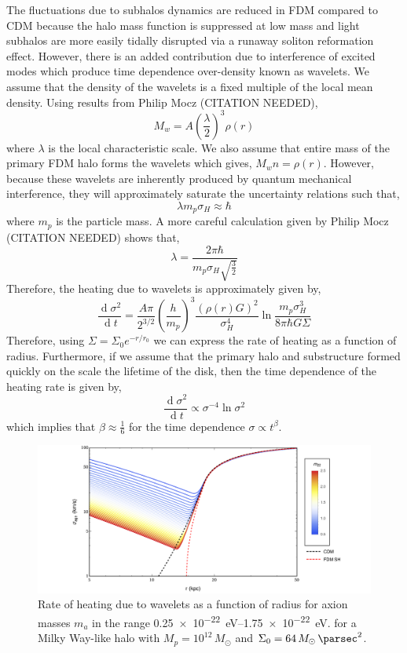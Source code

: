 \documentclass[usenatbib]{mnras}
\renewcommand{\d}[1]{\! \mathrm{d}#1 \:}
\newcommand{\deriv}[2]{\frac{\d{#1}}{\d{#2}}}
\renewcommand{\d}[1]{\ensuremath{\operatorname{d}\!{#1}}}
\begin{document}
The fluctuations due to subhalos dynamics are reduced in FDM compared to CDM because the halo mass function is suppressed at low mass and light subhalos are more easily tidally disrupted via a runaway soliton reformation effect. However, there is an added contribution due to interference of excited modes which produce time dependence over-density known as wavelets. We assume that the density of the wavelets is a fixed multiple of the local mean density. Using results from Philip Mocz (CITATION NEEDED),
\begin{equation}
M_w = A \left(\frac{\lambda}{2} \right)^3 \rho(r) 
\end{equation}  
where $\lambda$ is the local characteristic scale. We also assume that entire mass of the primary FDM halo forms the wavelets which gives, $M_w n = \rho(r)$. However, because these wavelets are inherently produced by quantum mechanical interference, they will approximately saturate the uncertainty relations such that,
\begin{equation}
\lambda m_p \sigma_H \approx \hbar
\end{equation}
where $m_p$ is the particle mass. 
A more careful calculation given by Philip Mocz (CITATION NEEDED) shows that,
\[ \lambda = \frac{ 2 \pi \hbar}{m_p \sigma_H \sqrt{\frac{3}{2}}} \]
Therefore, the heating due to wavelets is approximately given by,
\begin{equation}
\deriv{\sigma^2}{t} = \frac{A \pi}{2^{3/2}} \left( \frac{h}{m_p} \right)^3 \frac{(\rho(r) G)^2}{\sigma_H^4} \ln{\frac{m_p\sigma_H^3}{8 \pi \hbar G \Sigma}}
\end{equation}
Therefore, using $\Sigma = \Sigma_0 e^{-r/r_0}$ we can express the rate of heating as a function of radius. Furthermore, if we assume that the primary halo and substructure formed quickly on the scale the lifetime of the disk, then the time dependence of the heating rate is given by,
\begin{equation}
\deriv{\sigma^2}{t} \propto \sigma^{-4} \ln{\sigma^2} 
\end{equation} 
which implies that $\beta \approx \frac{1}{6}$ for the time dependence $\sigma \propto t^\beta$. 

\begin{figure}
\includegraphics[width=\columnwidth]{FDM_velocity}
\vspace*{-5mm}
\caption{Rate of heating due to wavelets as a function of radius for axion masses $m_{a}$ in the range \SIrange{0.25 e-22}{ 1.75 e-22}{\electronvolt}. for a Milky Way-like halo with $M_p = 10^{12} \, M_\odot$ and $\Sigma_0 = 64 \, M_\odot \, \si{\per\parsec^2}$.}
\label{fig:radiusheating}
\end{figure}
\end{document}
